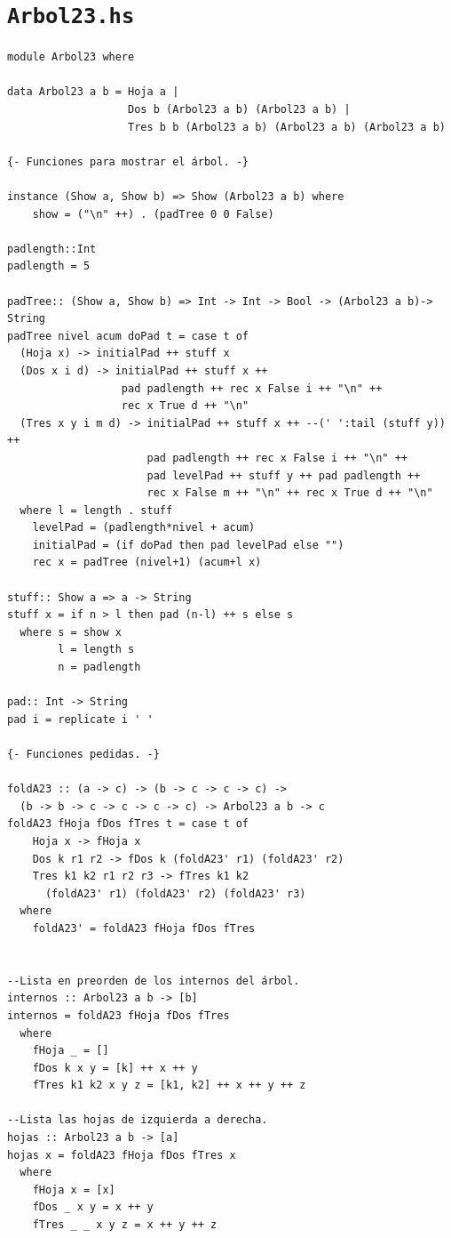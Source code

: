 \documentclass[a4paper]{article}
\begin{document}
\section{\texttt{Arbol23.hs}}
\begin{verbatim}
module Arbol23 where

data Arbol23 a b = Hoja a |
                   Dos b (Arbol23 a b) (Arbol23 a b) |
                   Tres b b (Arbol23 a b) (Arbol23 a b) (Arbol23 a b)

{- Funciones para mostrar el árbol. -}

instance (Show a, Show b) => Show (Arbol23 a b) where
    show = ("\n" ++) . (padTree 0 0 False)

padlength::Int
padlength = 5

padTree:: (Show a, Show b) => Int -> Int -> Bool -> (Arbol23 a b)-> String
padTree nivel acum doPad t = case t of
  (Hoja x) -> initialPad ++ stuff x
  (Dos x i d) -> initialPad ++ stuff x ++
                  pad padlength ++ rec x False i ++ "\n" ++
                  rec x True d ++ "\n"
  (Tres x y i m d) -> initialPad ++ stuff x ++ --(' ':tail (stuff y)) ++
                      pad padlength ++ rec x False i ++ "\n" ++
                      pad levelPad ++ stuff y ++ pad padlength ++
                      rec x False m ++ "\n" ++ rec x True d ++ "\n"
  where l = length . stuff
	levelPad = (padlength*nivel + acum)
	initialPad = (if doPad then pad levelPad else "")
	rec x = padTree (nivel+1) (acum+l x)

stuff:: Show a => a -> String
stuff x = if n > l then pad (n-l) ++ s else s
  where s = show x
        l = length s
        n = padlength

pad:: Int -> String
pad i = replicate i ' '

{- Funciones pedidas. -}

foldA23 :: (a -> c) -> (b -> c -> c -> c) ->
  (b -> b -> c -> c -> c -> c) -> Arbol23 a b -> c
foldA23 fHoja fDos fTres t = case t of
    Hoja x -> fHoja x
    Dos k r1 r2 -> fDos k (foldA23' r1) (foldA23' r2)
    Tres k1 k2 r1 r2 r3 -> fTres k1 k2
      (foldA23' r1) (foldA23' r2) (foldA23' r3)
  where
    foldA23' = foldA23 fHoja fDos fTres


--Lista en preorden de los internos del árbol.
internos :: Arbol23 a b -> [b]
internos = foldA23 fHoja fDos fTres
  where
    fHoja _ = []
    fDos k x y = [k] ++ x ++ y
    fTres k1 k2 x y z = [k1, k2] ++ x ++ y ++ z

--Lista las hojas de izquierda a derecha.
hojas :: Arbol23 a b -> [a]
hojas x = foldA23 fHoja fDos fTres x
  where
    fHoja x = [x]
    fDos _ x y = x ++ y
    fTres _ _ x y z = x ++ y ++ z


\end{verbatim}
\end{document}
